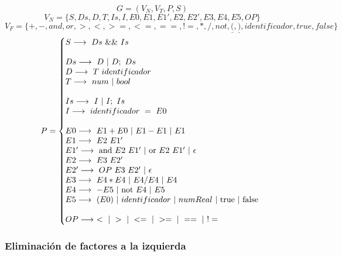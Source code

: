 $$G = (V_N, V_T, P, S)$$
$$V_N = \{S, Ds, D, T, Is, I, E0, E1, E1', E2, E2', E3, E4, E5, OP\}$$
$$V_F = \{+, -, and, or, >, <, >=, <=, ==, !=, *, /, not, \underline{(}, \underline{)}, identificador, true, false\}$$
\begin{equation*}P =\left\{
\begin{array}{@{}ll@{}}
S \longrightarrow\ Ds\ \&\&\ Is\\
\\
Ds \longrightarrow\ D\ |\ D;\ Ds\\
D \longrightarrow\ T\ identificador\\
T \longrightarrow\ num\ |\ bool\\
\\
Is \longrightarrow\ I\ |\ I;\ Is\\
I \longrightarrow\ identificador\ =\ E0\\
\\
E0 \longrightarrow\ E1 + E0\ |\ E1 - E1\ |\ E1\\
E1 \longrightarrow\ E2\ E1'\\
E1' \longrightarrow\ \text{and}\ E2\ E1'\ |\ \text{or}\ E2\ E1'\ |\ \epsilon \\
E2 \longrightarrow\ E3\ E2'\\
E2' \longrightarrow\ OP\ E3\ E2'\ |\ \epsilon \\
E3 \longrightarrow\ E4 * E4\ |\ E4 / E4\ |\ E4\\
E4 \longrightarrow\ -E5\ |\ \text{not}\ E4\ |\ E5\\
E5 \longrightarrow\ (E0)\ |\ identificador\ |\ numReal\ |\ \text{true}\ |\ \text{false}\\
\\
OP \longrightarrow\ <\ |\ >\ |\ <=\ |\ >=\ |\ ==\ |\ !=\\
\end{array}
\right .
\end{equation*}

\newpage
\subsubsection{Eliminación de factores a la izquierda}

